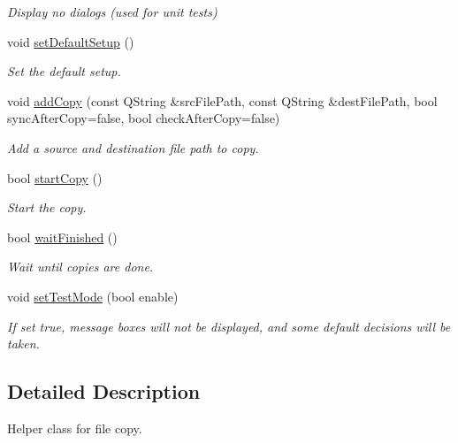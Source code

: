 \begin{DoxyCompactItemize}
\begin{DoxyCompactList}\small\item\em Display no dialogs (used for unit tests) \end{DoxyCompactList}\item 
void \hyperlink{classmdt_file_copier_a868ce61ec7d8f590002dd350276413a4}{setDefaultSetup} ()
\begin{DoxyCompactList}\small\item\em Set the default setup. \end{DoxyCompactList}\item 
void \hyperlink{classmdt_file_copier_ad0730aae81b3ba64eec4563390b852a3}{addCopy} (const QString \&srcFilePath, const QString \&destFilePath, bool syncAfterCopy=false, bool checkAfterCopy=false)
\begin{DoxyCompactList}\small\item\em Add a source and destination file path to copy. \end{DoxyCompactList}\item 
bool \hyperlink{classmdt_file_copier_acd5397fbea57f8169a5dddd2809d26cb}{startCopy} ()
\begin{DoxyCompactList}\small\item\em Start the copy. \end{DoxyCompactList}\item 
bool \hyperlink{classmdt_file_copier_adcfa582fe6e1e3420c8285c2301323f6}{waitFinished} ()
\begin{DoxyCompactList}\small\item\em Wait until copies are done. \end{DoxyCompactList}\item 
void \hyperlink{classmdt_file_copier_ad971d6b727c4ceaa1a39bf356d694654}{setTestMode} (bool enable)
\begin{DoxyCompactList}\small\item\em If set true, message boxes will not be displayed, and some default decisions will be taken. \end{DoxyCompactList}\end{DoxyCompactItemize}


\subsection{Detailed Description}
Helper class for file copy. 

